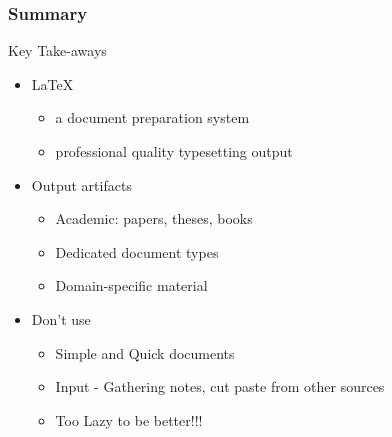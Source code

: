 \begin{frame}
\frametitle{Summary}
\begin{block}{Key Take-aways}
\begin{itemize}
\item \LaTeX
	\begin {itemize}
	\item a document preparation system
	\item professional quality typesetting output
	\end{itemize}
\item Output artifacts
	\begin{itemize}
	\item Academic: papers, theses, books
	\item Dedicated document types
	\item Domain-specific material
	\end{itemize}
\item Don't use
	\begin{itemize}
	\item Simple and Quick documents
	\item Input - Gathering notes, cut paste from other sources
	\item Too Lazy to be better!!!
	\end{itemize}
\end{itemize}
\end{block}
\end{frame}
